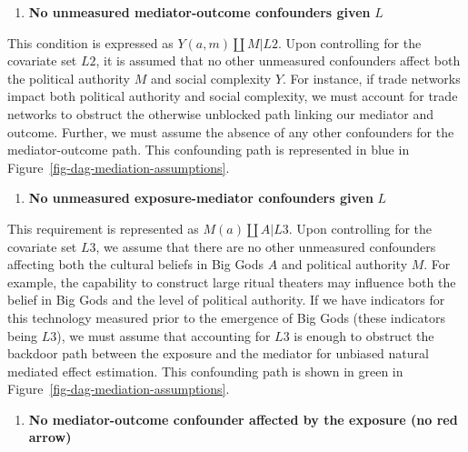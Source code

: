 \documentclass[
  singlecolumn]{report}
\providecommand{\tightlist}{%
  \setlength{\itemsep}{0pt}\setlength{\parskip}{0pt}}\usepackage{longtable,booktabs,array}
\begin{document}
\begin{enumerate}
\def\labelenumi{\arabic{enumi}.}
\setcounter{enumi}{1}
\tightlist
\item
  \textbf{No unmeasured mediator-outcome confounders given} \(L\)
\end{enumerate}

This condition is expressed as \(Y(a,m) \coprod M | L2\). Upon
controlling for the covariate set \(L2\), it is assumed that no other
unmeasured confounders affect both the political authority \(M\) and
social complexity \(Y\). For instance, if trade networks impact both
political authority and social complexity, we must account for trade
networks to obstruct the otherwise unblocked path linking our mediator
and outcome. Further, we must assume the absence of any other
confounders for the mediator-outcome path. This confounding path is
represented in blue in Figure~\ref{fig-dag-mediation-assumptions}.

\begin{enumerate}
\def\labelenumi{\arabic{enumi}.}
\setcounter{enumi}{2}
\tightlist
\item
  \textbf{No unmeasured exposure-mediator confounders given} \(L\)
\end{enumerate}

This requirement is represented as \(M(a) \coprod A | L3\). Upon
controlling for the covariate set \(L3\), we assume that there are no
other unmeasured confounders affecting both the cultural beliefs in Big
Gods \(A\) and political authority \(M\). For example, the capability to
construct large ritual theaters may influence both the belief in Big
Gods and the level of political authority. If we have indicators for
this technology measured prior to the emergence of Big Gods (these
indicators being \(L3\)), we must assume that accounting for \(L3\) is
enough to obstruct the backdoor path between the exposure and the
mediator for unbiased natural mediated effect estimation. This
confounding path is shown in green in
Figure~\ref{fig-dag-mediation-assumptions}.

\begin{enumerate}
\def\labelenumi{\arabic{enumi}.}
\setcounter{enumi}{3}
\tightlist
\item
  \textbf{No mediator-outcome confounder affected by the exposure (no
  red arrow)}
\end{enumerate}
\end{document}
